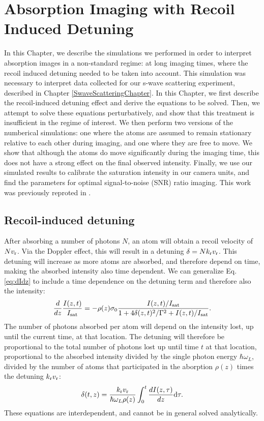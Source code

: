 \renewcommand{\thechapter}{3}

\chapter{Absorption Imaging with Recoil Induced Detuning}\label{AbsorptionImagingChapter}

In this Chapter, we describe the simulations we performed in order to interpret absorption images in a non-standard regime: at long imaging times, where the recoil induced detuning needed to be taken into account. This simulation was necessary to interpret data collected for our s-wave scattering experiment, described in Chapter \ref{SwaveScatteringChapter}. In this Chapter, we first describe the recoil-induced detuning effect  and derive the equations to be solved. Then, we attempt to solve these equations perturbatively, and show that this treatment is insufficient in the regime of interest. We then perform two versions of the numberical simulations: one where the atoms are assumed to remain stationary relative to each other during imaging, and one where they are free to move. We show that although the atoms do move significantly during the imaging time, this does not have a strong effect on the final observed intensity. Finally, we use our simulated results to calibrate the saturation intensity in our camera units, and find the parameters for optimal signal-to-noise (SNR) ratio imaging. This work was previously reproted in \cite{Genkina2015}.


\section{Recoil-induced detuning}

After absorbing a number of photons $N$, an atom will obtain a recoil velocity of $N v_{\rm{r}}$. Via the Doppler effect, this will result in a detuning $\delta=N k_{\rm{r}} v_{\rm{r}}$. This detuning will increase as more atoms are absorbed, and therefore depend on time, making the absorbed intensity also time dependent. We can generalize Eq. \ref{eq:dIdz} to include a time dependence on the detuning term and therefore also the intensity: 
\begin{equation}
\frac{d}{dz}\frac{I(z,t)}{I_{\rm{sat}}}=-\rho(z)\sigma_0\frac{I(z,t)/I_{\rm{sat}}}{1+4\delta(z,t)^2 /\Gamma^2+I(z,t)/I_{\rm{sat}}}. \label{eq3}
\end{equation}
The number of photons absorbed per atom will depend on the intensity lost, up until the current time, at that location. The detuning will therefore be proportional to the total number of photons lost up until time $t$ at that location, proportional to the absorbed intensity divided by the single photon energy $\hbar\omega_L$, divided by the number of atoms that participated in the aborption $\rho(z)$ times the detuning $ k_{\rm{r}} v_{\rm{r}}$:
\begin{equation}
\delta(t,z)=\frac{ k_{\rm{r}} v_{\rm{r}}}{\hbar\omega_L\rho(z)}\int_0^t\frac{dI(z,\tau)}{dz}\mathrm{d}\tau.
\label{eq4}
\end{equation}
These equations are interdependent, and cannot be in general solved analytically. 

